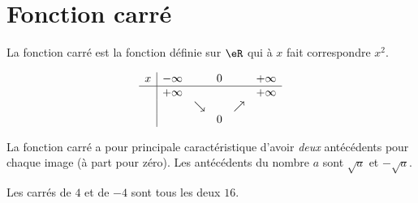 
\section{Fonction carré}

    La fonction carré est la fonction définie sur \( \eR\) qui à \( x\) fait correspondre \( x^2\).

    \begin{multicols}{2}

        \begin{equation*}
            \begin{array}[]{c|ccccc}
                x&-\infty&&0&&+\infty\\
                \hline
                &+\infty&&&&+\infty\\
                &&\searrow&&\nearrow&\\
                &&&0&&
            \end{array}
        \end{equation*}

        \columnbreak

        \begin{center}

        \end{center}

    \end{multicols}
    

\begin{Aretenir}
    La fonction carré a pour principale caractéristique d'avoir \emph{deux} antécédents pour chaque image (à part pour zéro). Les antécédents du nombre \( a\) sont \( \sqrt{a}\) et \( -\sqrt{a}\).
\end{Aretenir}

\begin{example}
    Les carrés de \( 4\) et de \( -4\) sont tous les deux \( 16\).
\end{example}

